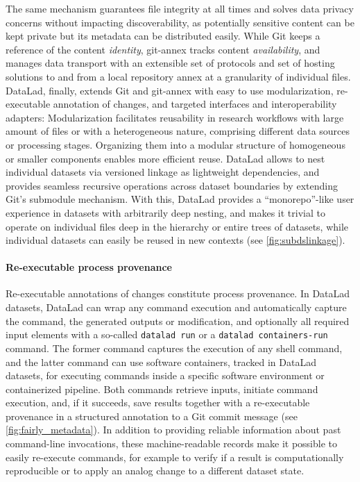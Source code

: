 {The same mechanism guarantees file integrity at all times and solves data privacy concerns without impacting discoverability, as potentially sensitive content can be kept private but its metadata can be distributed easily.
While Git keeps a reference of the content \textit{identity}, git-annex tracks content \textit{availability}, and manages data transport with an extensible set of protocols and set of hosting solutions to and from a local repository annex at a granularity of individual files. \\
DataLad, finally, extends Git and git-annex with easy to use modularization, re-executable annotation of changes, and targeted interfaces and interoperability adapters:
Modularization facilitates reusability in research workflows with large amount of files or with a heterogeneous nature, comprising different data sources or processing stages.
Organizing them into a modular structure of homogeneous or smaller components enables more efficient reuse.
DataLad allows to nest individual datasets via versioned linkage as lightweight dependencies, and provides seamless recursive operations across dataset boundaries by extending Git’s submodule mechanism.
With this, DataLad provides a ``monorepo''-like user experience in datasets with arbitrarily deep nesting, and makes it trivial to operate on individual files deep in the hierarchy or entire trees of datasets, while individual datasets can easily be reused in new contexts (see \cref{fig:subdslinkage}).\\

\paragraph{Re-executable process provenance}
Re-executable annotations of changes constitute process provenance.
In DataLad datasets, DataLad can wrap any command execution and automatically capture the command, the generated outputs or modification, and optionally all required input elements with a so-called \texttt{datalad run} or a \texttt{datalad containers-run} command.
The former command captures the execution of any shell command, and the latter command can use software containers, tracked in DataLad datasets, for executing commands inside a specific software environment or containerized pipeline.
Both commands retrieve inputs, initiate command execution, and, if it succeeds, save results together with a re-executable provenance in a structured annotation to a Git commit message (see \cref{fig:fairly_metadata}).
In addition to providing reliable information about past command-line invocations, these machine-readable records make it possible to easily re-execute commands, for example to verify if a result is computationally reproducible or to apply an analog change to a different dataset state.\\

}
